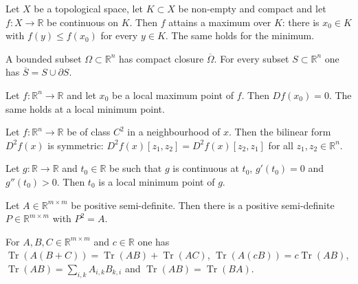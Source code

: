\begin{proposition}[Weierstrass]
Let $X$ be a topological space, let $K\subset X$ be non-empty and compact and let $f:X\to\mathbb{R}$
be continuous on $K$. Then $f$ attains a maximum over $K$: there is $x_0\in K$ with
$f(y)\leq f(x_0)$ for every $y\in K$. The same holds for the minimum.
\end{proposition}

\begin{proposition}
A bounded subset $\Omega\subset\mathbb{R}^n$ has compact closure $\overline\Omega$. For every
subset $S\subset\mathbb{R}^n$ one has $\overline{S}=S\cup\partial S$.
\end{proposition}

\begin{proposition}
Let $f:\mathbb{R}^n\to\mathbb{R}$ and let $x_0$ be a local maximum point of $f$. Then
$Df(x_0)=0$. The same holds at a local minimum point.
\end{proposition}

\begin{proposition}
Let $f:\mathbb{R}^n\to\mathbb{R}$ be of class $C^2$ in a neighbourhood of $x$. Then the bilinear
form $D^2f(x)$ is symmetric: $D^2f(x)[z_1,z_2]=D^2f(x)[z_2,z_1]$ for all
$z_1,z_2\in\mathbb{R}^n$.
\end{proposition}

\begin{proposition}
Let $g:\mathbb{R}\to\mathbb{R}$ and $t_0\in\mathbb{R}$ be such that $g$ is continuous at $t_0$,
$g'(t_0)=0$ and $g''(t_0)>0$. Then $t_0$ is a local minimum point of $g$.
\end{proposition}

\begin{proposition}
Let $A\in\mathbb{R}^{m\times m}$ be positive semi-definite. Then there is a positive semi-definite
$P\in\mathbb{R}^{m\times m}$ with $P^2=A$.
\end{proposition}

\begin{proposition}
For $A,B,C\in\mathbb{R}^{m\times m}$ and $c\in\mathbb{R}$ one has
$\operatorname{Tr}(A(B+C))=\operatorname{Tr}(AB)+\operatorname{Tr}(AC)$,
$\operatorname{Tr}(A(cB))=c\operatorname{Tr}(AB)$,
$\operatorname{Tr}(AB)=\sum_{i,k}A_{i,k}B_{k,i}$ and $\operatorname{Tr}(AB)=\operatorname{Tr}(BA)$.
\end{proposition}
